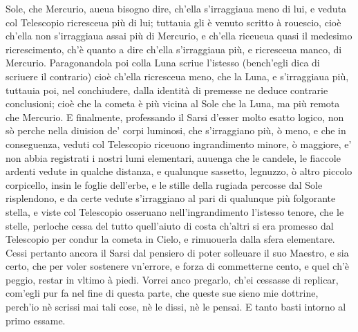 \documentclass[11pt,twoside,openany]{book}
\begin{document}
Sole, che Mercurio, aueua bisogno dire, ch'ella s'irraggiaua meno di lui, e veduta col Telescopio ricresceua più di lui; tuttauia gli è venuto scritto à rouescio, cioè ch'ella non s'irraggiaua assai più di Mercurio, e ch'ella riceueua quasi il medesimo ricrescimento, ch'è quanto a dire ch'ella s'irraggiaua più, e ricresceua manco, di Mercurio. Paragonandola poi colla Luna scriue l'istesso (bench'egli dica di scriuere il contrario) cioè ch'ella ricresceua meno, che la Luna, e s'irraggiaua più, tuttauia poi, nel conchiudere, dalla identità di premesse ne deduce contrarie conclusioni; cioè che la cometa è più vicina al Sole che la Luna, ma più remota che Mercurio. E finalmente, professando il Sarsi d'esser molto esatto logico, non sò perche nella diuision de' corpi luminosi, che s'irraggiano più, ò meno, e che in conseguenza, veduti col Telescopio riceuono ingrandimento minore, ò maggiore, e' non abbia registrati i nostri lumi elementari, auuenga che le candele, le fiaccole ardenti vedute in qualche distanza, e qualunque sassetto, legnuzzo, ò altro piccolo corpicello, insin le foglie dell'erbe, e le stille della rugiada percosse dal Sole risplendono, e da certe vedute s'irraggiano al pari di qualunque più folgorante stella, e viste col Telescopio osseruano nell'ingrandimento l'istesso tenore, che le stelle, perloche cessa del tutto quell'aiuto di costa ch'altri si era promesso dal Telescopio per condur la cometa in Cielo, e rimuouerla dalla sfera elementare. Cessi pertanto ancora il Sarsi dal pensiero di poter solleuare il suo Maestro, e sia certo, che per voler sostenere vn'errore, e forza di commetterne cento, e quel ch'è peggio, restar in vltimo à piedi. Vorrei anco pregarlo, ch'ei cessasse di replicar, com'egli pur fa nel fine di questa parte, che queste sue sieno mie dottrine, perch'io nè scrissi mai tali cose, nè le dissi, nè le pensai. E tanto basti intorno al primo essame.
\end{document}
